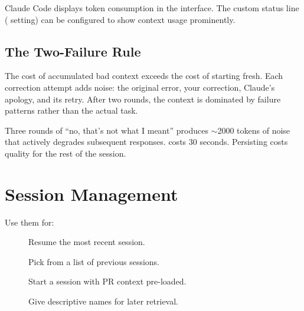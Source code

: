 
 Claude Code displays token consumption in the interface.
The custom status line ( setting) can be configured to show
context usage prominently.


\subsection{The Two-Failure Rule}


The cost of accumulated bad context exceeds the cost of starting fresh.
Each correction attempt adds noise: the original error, your correction,
Claude's apology, and its retry. After two rounds, the context is
dominated by failure patterns rather than the actual task.

\begin{warnbox}
Three rounds of ``no, that's not what I meant'' produces $\sim$2000 tokens
of noise that actively degrades subsequent responses.  costs
30 seconds. Persisting costs quality for the rest of the session.
\end{warnbox}

\section{Session Management}
\label{sec:sessions}


 Use them for:

\begin{description}
  \item[] Resume the most recent session.
  \item[] Pick from a list of previous sessions.
  \item[] Start a session with PR context pre-loaded.
  \item[] Give descriptive names for later retrieval.
\end{description}

